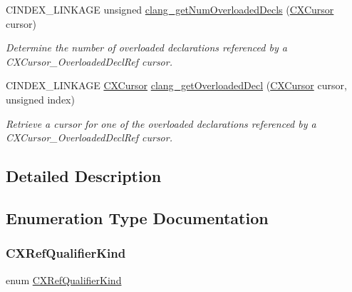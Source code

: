 \begin{DoxyCompactItemize}
C\+I\+N\+D\+E\+X\+\_\+\+L\+I\+N\+K\+A\+GE unsigned \hyperlink{group__CINDEX__TYPES_ga6fd1dfa66abaf18574c74a98e12856bc}{clang\+\_\+get\+Num\+Overloaded\+Decls} (\hyperlink{structCXCursor}{C\+X\+Cursor} cursor)
\begin{DoxyCompactList}\small\item\em Determine the number of overloaded declarations referenced by a {\ttfamily C\+X\+Cursor\+\_\+\+Overloaded\+Decl\+Ref} cursor. \end{DoxyCompactList}\item 
C\+I\+N\+D\+E\+X\+\_\+\+L\+I\+N\+K\+A\+GE \hyperlink{structCXCursor}{C\+X\+Cursor} \hyperlink{group__CINDEX__TYPES_gab1c718b939700a6c23adfb9729c9c28f}{clang\+\_\+get\+Overloaded\+Decl} (\hyperlink{structCXCursor}{C\+X\+Cursor} cursor, unsigned index)
\begin{DoxyCompactList}\small\item\em Retrieve a cursor for one of the overloaded declarations referenced by a {\ttfamily C\+X\+Cursor\+\_\+\+Overloaded\+Decl\+Ref} cursor. \end{DoxyCompactList}\end{DoxyCompactItemize}


\subsection{Detailed Description}


\subsection{Enumeration Type Documentation}
\mbox{\label{group__CINDEX__TYPES_ga28389bbe03a77eded92086f0011d86eb}} 
\subsubsection{\texorpdfstring{C\+X\+Ref\+Qualifier\+Kind}{CXRefQualifierKind}}
{\footnotesize\ttfamily enum \hyperlink{group__CINDEX__TYPES_ga28389bbe03a77eded92086f0011d86eb}{C\+X\+Ref\+Qualifier\+Kind}}

